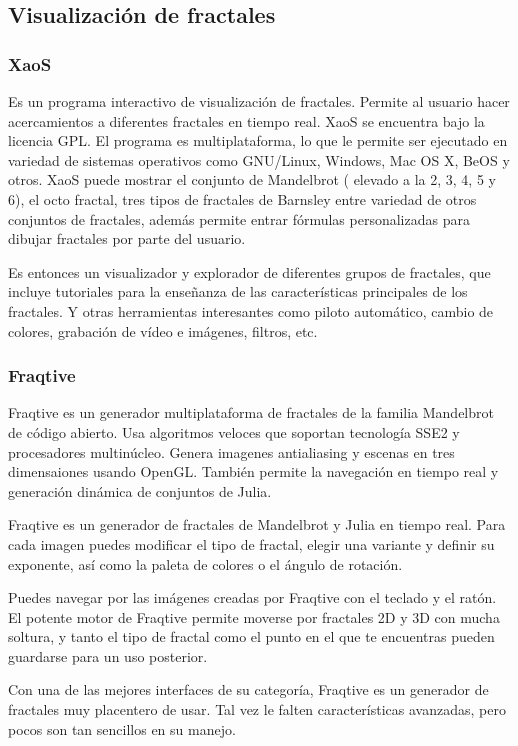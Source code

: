 \documentclass[letterpaper, 11pt, oneside]{article}
\theoremstyle{definition}
\theoremstyle{remark}
\begin{document}
\subsection{Visualización de fractales}
\subsubsection{XaoS}
Es un programa interactivo de visualización de fractales. Permite al usuario hacer acercamientos a diferentes fractales en tiempo real. XaoS se encuentra bajo la licencia GPL. El programa es multiplataforma, lo que le permite ser ejecutado en variedad de sistemas operativos como GNU/Linux, Windows, Mac OS X, BeOS y otros.
XaoS puede mostrar el conjunto de Mandelbrot ( elevado a la 2, 3, 4, 5 y 6), el octo fractal, tres tipos de fractales de Barnsley entre variedad de otros conjuntos de fractales, además permite entrar fórmulas personalizadas para dibujar fractales por parte del usuario.

Es entonces un visualizador y explorador de diferentes grupos de fractales, que incluye tutoriales para la enseñanza de las características principales de los fractales. Y otras herramientas interesantes como piloto automático, cambio de colores, grabación de vídeo e imágenes, filtros, etc. 
\subsubsection{Fraqtive}
Fraqtive es un generador multiplataforma de fractales de la familia Mandelbrot de código abierto. Usa algoritmos veloces que soportan tecnología SSE2 y procesadores multinúcleo. Genera imagenes antialiasing y escenas en tres dimensaiones usando OpenGL. También permite la navegación en tiempo real y generación dinámica de conjuntos de Julia.

Fraqtive es un generador de fractales de Mandelbrot y Julia en tiempo real. Para cada imagen puedes modificar el tipo de fractal, elegir una variante y definir su exponente, así como la paleta de colores o el ángulo de rotación.

Puedes navegar por las imágenes creadas por Fraqtive con el teclado y el ratón. El potente motor de Fraqtive permite moverse por fractales 2D y 3D con mucha soltura, y tanto el tipo de fractal como el punto en el que te encuentras pueden guardarse para un uso posterior.

Con una de las mejores interfaces de su categoría, Fraqtive es un generador de fractales muy placentero de usar. Tal vez le falten características avanzadas, pero pocos son tan sencillos en su manejo.
\end{document}
